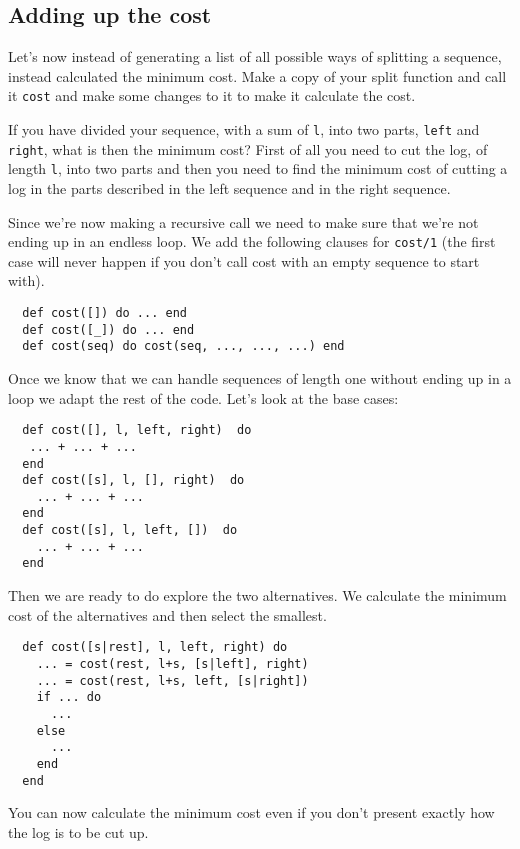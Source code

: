 \documentclass[a4paper,11pt]{article}
\begin{document}
\subsection*{Adding up the cost}

Let's now instead of generating a list of all possible ways of
splitting a sequence, instead calculated the minimum cost. Make a copy
of your split function and call it {\tt cost} and make some changes to
it to make it calculate the cost.

If you have divided your sequence, with a sum of {\tt l}, into two
parts, {\tt left} and {\tt right}, what is then the minimum cost?
First of all you need to cut the log, of length {\tt l}, into two
parts and then you need to find the minimum cost of cutting a log in
the parts described in the left sequence and in the right sequence.

Since we're now making a recursive call we need to make sure that
we're not ending up in an endless loop. We add the following clauses
for {\tt cost/1} (the first case will never happen if you don't call
cost with an empty sequence to start with).

\begin{verbatim}
  def cost([]) do ... end  
  def cost([_]) do ... end  
  def cost(seq) do cost(seq, ..., ..., ...) end
\end{verbatim}

\noindent Once we know that we can handle sequences of length one without ending
up in a loop we adapt the rest of the code. Let's look at the base cases:

\begin{verbatim}
  def cost([], l, left, right)  do
   ... + ... + ...
  end
  def cost([s], l, [], right)  do
    ... + ... + ...
  end
  def cost([s], l, left, [])  do
    ... + ... + ...
  end
\end{verbatim}

\noindent Then we are ready to do explore the two alternatives. We
calculate the minimum cost of the alternatives and then select the smallest.

\begin{verbatim}
  def cost([s|rest], l, left, right) do
    ... = cost(rest, l+s, [s|left], right)
    ... = cost(rest, l+s, left, [s|right])
    if ... do
      ...
    else
      ...
    end
  end
 \end{verbatim}

 \noindent You can now calculate the minimum cost even if you don't
 present exactly how the log is to be cut up.
\end{document}
